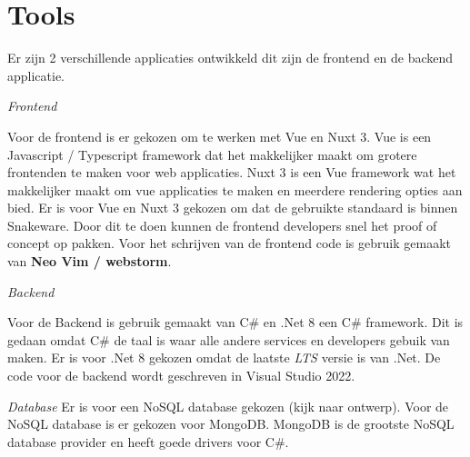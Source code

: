\section{Tools}
Er zijn 2 verschillende applicaties ontwikkeld dit zijn de frontend en de backend applicatie.

\whitespace[2]
\textit{Frontend}

\whitespace[2]
Voor de frontend is er gekozen om te werken met Vue en Nuxt 3. 
Vue is een Javascript / Typescript framework dat het makkelijker maakt om grotere frontenden te maken voor web applicaties.
Nuxt 3 is een Vue framework wat het makkelijker maakt om vue applicaties te maken en meerdere rendering opties aan bied.
Er is voor Vue en Nuxt 3 gekozen om dat de gebruikte standaard is binnen Snakeware.
Door dit te doen kunnen de frontend developers snel het proof of concept op pakken.
Voor het schrijven van de frontend code is gebruik gemaakt van \textbf{Neo Vim / webstorm}.

\whitespace[2]
\textit{Backend}

\whitespace[2]
Voor de Backend is gebruik gemaakt van C\# en .Net 8 een C\# framework.
Dit is gedaan omdat C\# de taal is waar alle andere services en developers gebuik van maken.
Er is voor .Net 8 gekozen omdat de laatste \textit{LTS} versie is van .Net.
De code voor de backend wordt geschreven in Visual Studio 2022.

\whitespace[2]
\textit{Database}
Er is voor een NoSQL database gekozen (kijk naar ontwerp).
Voor de NoSQL database is er gekozen voor MongoDB.
MongoDB is de grootste NoSQL database provider en heeft goede drivers voor C\#.
